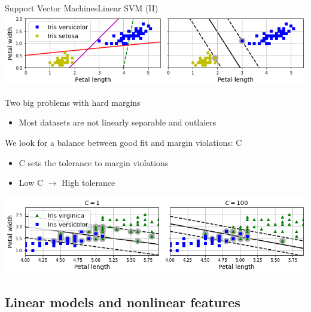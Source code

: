 \documentclass[10pt,compress]{beamer} %
\begin{document}
\begin{frame}{Support Vector Machines}{Linear SVM (II)}
    \centering \includegraphics[width=0.8\linewidth]{figs/svm-linear.png}\\
    \flushleft

    Two big problems with hard margins
    \begin{itemize}
        \item Most datasets are not linearly separable and outlaiers
    \end{itemize}

    We look for a balance between good fit and margin violations: C
    \begin{itemize}
        \item C sets the tolerance to margin violations
        \item Low C $\rightarrow$ High tolerance
    \end{itemize}

    \centering \includegraphics[width=0.8\linewidth]{figs/svm-c.png}
\end{frame}

\subsection{Linear models and nonlinear features}
\end{document}
